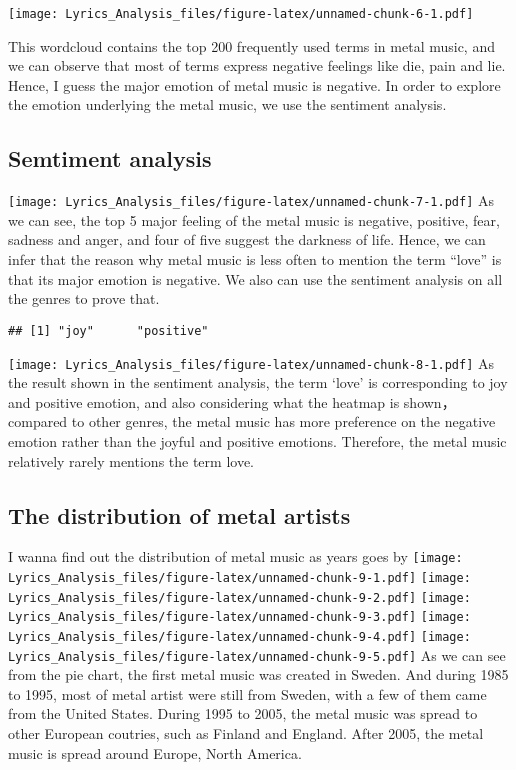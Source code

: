 \documentclass[]{article}
\begin{document}
\texttt{[image: Lyrics\_Analysis\_files/figure-latex/unnamed-chunk-6-1.pdf]}

This wordcloud contains the top 200 frequently used terms in metal
music, and we can observe that most of terms express negative feelings
like die, pain and lie. Hence, I guess the major emotion of metal music
is negative. In order to explore the emotion underlying the metal music,
we use the sentiment analysis.

\hypertarget{semtiment-analysis}{%
\subsection{Semtiment analysis}\label{semtiment-analysis}}

\texttt{[image: Lyrics\_Analysis\_files/figure-latex/unnamed-chunk-7-1.pdf]}
As we can see, the top 5 major feeling of the metal music is negative,
positive, fear, sadness and anger, and four of five suggest the darkness
of life. Hence, we can infer that the reason why metal music is less
often to mention the term ``love'' is that its major emotion is
negative. We also can use the sentiment analysis on all the genres to
prove that.

\begin{verbatim}
## [1] "joy"      "positive"
\end{verbatim}

\texttt{[image: Lyrics\_Analysis\_files/figure-latex/unnamed-chunk-8-1.pdf]}
As the result shown in the sentiment analysis, the term `love' is
corresponding to joy and positive emotion, and also considering what the
heatmap is shown，compared to other genres, the metal music has more
preference on the negative emotion rather than the joyful and positive
emotions. Therefore, the metal music relatively rarely mentions the term
love.

\hypertarget{the-distribution-of-metal-artists}{%
\subsection{The distribution of metal
artists}\label{the-distribution-of-metal-artists}}

I wanna find out the distribution of metal music as years goes by
\texttt{[image: Lyrics\_Analysis\_files/figure-latex/unnamed-chunk-9-1.pdf]}
\texttt{[image: Lyrics\_Analysis\_files/figure-latex/unnamed-chunk-9-2.pdf]}
\texttt{[image: Lyrics\_Analysis\_files/figure-latex/unnamed-chunk-9-3.pdf]}
\texttt{[image: Lyrics\_Analysis\_files/figure-latex/unnamed-chunk-9-4.pdf]}
\texttt{[image: Lyrics\_Analysis\_files/figure-latex/unnamed-chunk-9-5.pdf]}
As we can see from the pie chart, the first metal music was created in
Sweden. And during 1985 to 1995, most of metal artist were still from
Sweden, with a few of them came from the United States. During 1995 to
2005, the metal music was spread to other European coutries, such as
Finland and England. After 2005, the metal music is spread around
Europe, North America.
\end{document}
